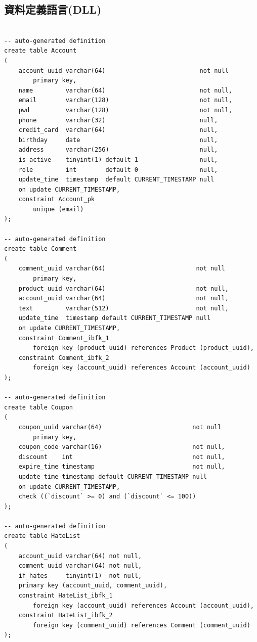 \documentclass[a4paper, 12pt]{article}
\begin{document}
\subsection{資料定義語言(DLL)}
\begin{verbatim}

-- auto-generated definition
create table Account
(
    account_uuid varchar(64)                          not null
        primary key,
    name         varchar(64)                          not null,
    email        varchar(128)                         not null,
    pwd          varchar(128)                         not null,
    phone        varchar(32)                          null,
    credit_card  varchar(64)                          null,
    birthday     date                                 null,
    address      varchar(256)                         null,
    is_active    tinyint(1) default 1                 null,
    role         int        default 0                 null,
    update_time  timestamp  default CURRENT_TIMESTAMP null 
    on update CURRENT_TIMESTAMP,
    constraint Account_pk
        unique (email)
);

-- auto-generated definition
create table Comment
(
    comment_uuid varchar(64)                         not null
        primary key,
    product_uuid varchar(64)                         not null,
    account_uuid varchar(64)                         not null,
    text         varchar(512)                        not null,
    update_time  timestamp default CURRENT_TIMESTAMP null
    on update CURRENT_TIMESTAMP,
    constraint Comment_ibfk_1
        foreign key (product_uuid) references Product (product_uuid),
    constraint Comment_ibfk_2
        foreign key (account_uuid) references Account (account_uuid)
);

-- auto-generated definition
create table Coupon
(
    coupon_uuid varchar(64)                         not null
        primary key,
    coupon_code varchar(16)                         not null,
    discount    int                                 not null,
    expire_time timestamp                           not null,
    update_time timestamp default CURRENT_TIMESTAMP null
    on update CURRENT_TIMESTAMP,
    check ((`discount` >= 0) and (`discount` <= 100))
);

-- auto-generated definition
create table HateList
(
    account_uuid varchar(64) not null,
    comment_uuid varchar(64) not null,
    if_hates     tinyint(1)  not null,
    primary key (account_uuid, comment_uuid),
    constraint HateList_ibfk_1
        foreign key (account_uuid) references Account (account_uuid),
    constraint HateList_ibfk_2
        foreign key (comment_uuid) references Comment (comment_uuid)
);


\end{verbatim}
\end{document}
